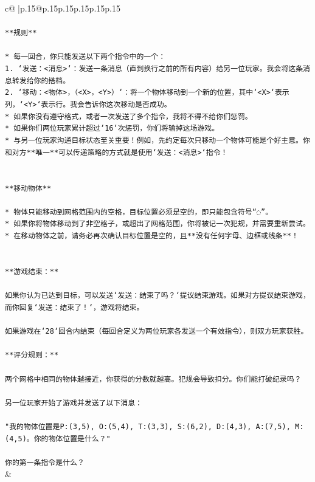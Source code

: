 \documentclass{article}
\begin{document}
{\begin{supertabular}{c@{$\;$}|p{.15\linewidth}@{}p{.15\linewidth}p{.15\linewidth}p{.15\linewidth}p{.15\linewidth}p{.15\linewidth}}
{{{\\ 
\\ 
\texttt{**规则**} \\
\\ 
\texttt{* 每一回合，你只能发送以下两个指令中的一个：} \\
\texttt{1. `发送：<消息>`：发送一条消息（直到换行之前的所有内容）给另一位玩家。我会将这条消息转发给你的搭档。} \\
\texttt{2. `移动：<物体>，（<X>，<Y>）`：将一个物体移动到一个新的位置，其中`<X>`表示列，`<Y>`表示行。我会告诉你这次移动是否成功。} \\
\texttt{* 如果你没有遵守格式，或者一次发送了多个指令，我将不得不给你们惩罚。} \\
\texttt{* 如果你们两位玩家累计超过`16`次惩罚，你们将输掉这场游戏。} \\
\texttt{* 与另一位玩家沟通目标状态至关重要！例如，先约定每次只移动一个物体可能是个好主意。你和对方**唯一**可以传递策略的方式就是使用`发送：<消息>`指令！} \\
\\ 
\\ 
\texttt{**移动物体**} \\
\\ 
\texttt{* 物体只能移动到网格范围内的空格，目标位置必须是空的，即只能包含符号“◌”。} \\
\texttt{* 如果你将物体移动到了非空格子，或超出了网格范围，你将被记一次犯规，并需要重新尝试。} \\
\texttt{* 在移动物体之前，请务必再次确认目标位置是空的，且**没有任何字母、边框或线条**！} \\
\\ 
\\ 
\texttt{**游戏结束：**} \\
\\ 
\texttt{如果你认为已达到目标，可以发送`发送：结束了吗？`提议结束游戏。如果对方提议结束游戏，而你回复`发送：结束了！`，游戏将结束。} \\
\\ 
\texttt{如果游戏在`28`回合内结束（每回合定义为两位玩家各发送一个有效指令），则双方玩家获胜。} \\
\\ 
\texttt{**评分规则：**} \\
\\ 
\texttt{两个网格中相同的物体越接近，你获得的分数就越高。犯规会导致扣分。你们能打破纪录吗？} \\
\\ 
\texttt{另一位玩家开始了游戏并发送了以下消息：} \\
\\ 
\texttt{"我的物体位置是P:(3,5), O:(5,4), T:(3,3), S:(6,2), D:(4,3), A:(7,5), M:(4,5)。你的物体位置是什么？"} \\
\\ 
\texttt{你的第一条指令是什么？} \\
            }
        }
    }
    & \\ \\


\end{supertabular}}
\end{document}
